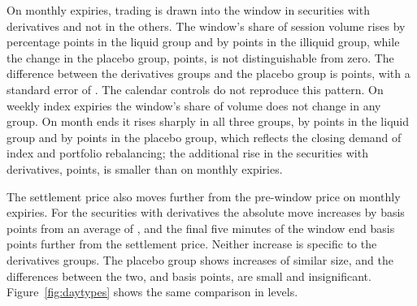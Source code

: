 \begin{table}[htbp]
\centering
\small
\caption{Activity in the settlement window by type of session. Each entry is the coefficient
on an indicator for the session type in a regression with security fixed effects, estimated
separately for each group, and measures the difference from ordinary sessions of the same
security. The last column is the difference between the securities with derivatives and the
placebo group, estimated with security and session fixed effects. Standard errors clustered
by session in parentheses. $^{*}$, $^{**}$ and $^{***}$ denote significance at the ten, five
and one per cent levels.}
\label{tab:activity}
\resizebox{\textwidth}{!}{}
\end{table}

On monthly expiries, trading is drawn into the window in securities with derivatives and not
in the others. The window's share of session volume rises by \ActWindowshareLiquidMonthlyexpiry{}
percentage points in the liquid group and by \ActWindowshareIlliquidMonthlyexpiry{} points
in the illiquid group, while the change in the placebo group, \ActWindowsharePlaceboMonthlyexpiry{}
points, is not distinguishable from zero. The difference between the derivatives groups and
the placebo group is \ActWindowshareDidMonthlyexpiry{} points, with a standard error of
\ActWindowshareDidMonthlyexpirySe{}. The calendar controls do not reproduce this pattern. On weekly
index expiries the window's share of volume does not change in any group. On month ends it
rises sharply in all three groups, by \ActWindowshareLiquidMonthend{} points in the liquid
group and by \ActWindowsharePlaceboMonthend{} points in the placebo group, which reflects the
closing demand of index and portfolio rebalancing; the additional rise in the securities with
derivatives, \ActWindowshareDidMonthend{} points, is smaller than on monthly expiries.

The settlement price also moves further from the pre-window price on monthly expiries. For
the securities with derivatives the absolute move increases by
\ActAbsdriftDerivativeMonthlyexpiry{} basis points from an average of
\ActAbsdriftDerivativeNormal{}, and the final five minutes of the window end
\ActAbsterminalDerivativeMonthlyexpiry{} basis points further from the settlement price.
Neither increase is specific to the derivatives groups. The placebo group shows increases of
similar size, and the differences between the two, \ActAbsdriftDidMonthlyexpiry{} and
\ActAbsterminalDidMonthlyexpiry{} basis points, are small and insignificant. Figure~\ref{fig:daytypes}
shows the same comparison in levels.

